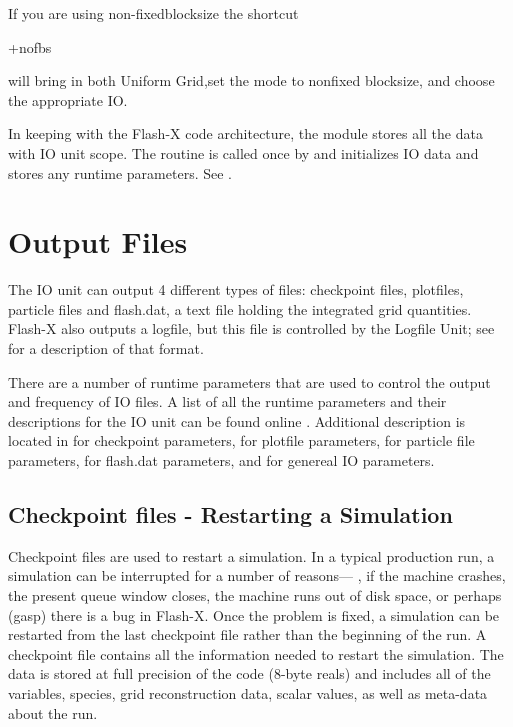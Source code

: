 If you are using non-fixedblocksize the shortcut
\begin{codeseg}
+nofbs
\end{codeseg}
will bring in both Uniform Grid,set the mode to nonfixed blocksize, and 
choose the appropriate IO.

In keeping with the Flash-X code architecture, the  module
 stores all the data with \unit{IO} unit scope. The routine
 is called once by  and
initializes \unit{IO} data and stores any runtime parameters. See
.



\section{Output Files}
The IO unit can output 4 different types of files: checkpoint
files, plotfiles, particle files and flash.dat, a text file holding
the integrated grid quantities.  Flash-X also outputs a logfile, but this
file is controlled by the Logfile Unit; see 
for a description of that format.


There are a number of runtime parameters that are used to control the
output and frequency of IO files.  A list of all the runtime parameters and
their descriptions for the \unit{IO} unit can be found online
.  Additional description is located in  
 for checkpoint parameters, 
 for plotfile parameters,
 for particle file parameters, 
 for flash.dat parameters,
and  for genereal IO parameters.
 

\subsection{Checkpoint files - Restarting a Simulation}
Checkpoint files are used to restart a simulation.  In a typical
production run, a simulation can be interrupted for a number of
reasons--- \eg, if the machine crashes, the present queue window
closes, the machine runs out of disk space, or perhaps (gasp) there is a bug
in Flash-X.  Once the problem is fixed, a simulation can be restarted
from the last checkpoint file rather than the beginning of the run.  A
checkpoint file%
contains all the
information needed to restart the simulation.  The data is stored at
full precision of the code (8-byte reals) and includes all of the
variables, species, grid reconstruction data, scalar values,  as well
as meta-data about the run.

